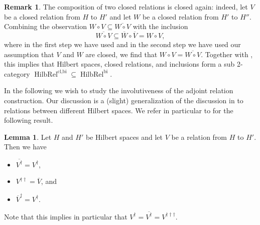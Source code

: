 \documentclass{article}
\newcommand{\HilbRel}{\operatorname{HilbRel}}%
\numberwithin{equation}{section}
\theoremstyle{definition}
\newtheorem{lemma}[definition]{Lemma}
\newtheorem{remark}[definition]{Remark}
\theoremstyle{theorem}
\begin{document}
\begin{remark}
    The composition of two closed relations is closed again: indeed, let $V$ be a closed relation from $H$ to $H'$ and let $W$ be a closed relation from 
    $H'$ to $H''$. Combining the observation $W \circ V \subseteq \overline{W \circ V}$ with the inclusion 
    \begin{equation}
        \overline{W \circ V} \subseteq \overline{W} \circ \overline{V} = W \circ V,
    \end{equation}
    where in the first step we have used  and in the second step we have used our assumption 
    that $V$ and $W$ are closed, we find that $W \circ V = \overline{W \circ V}$. Together with , 
    this implies that Hilbert spaces, closed relations, and inclusions form a sub 2-category $\HilbRel^{\text{cl,bi}} \subseteq \HilbRel^{\text{bi}}$. 
\end{remark}
In the following we wish to study the involutiveness of the adjoint relation construction. Our discussion is a (slight) generalization of the discussion in 
\cite{Remline2021unbounded} to relations between different Hilbert spaces. We refer in particular to \cite[Theorem 11.7]{Remline2021unbounded} for the following result.
\begin{lemma}\label{Lemma: relations adjoints and closedness}
    Let $H$ and $H'$ be Hilbert spaces and let $V$ be a relation from $H$ to $H'$. Then we have
    \begin{itemize}
        \item[(i)] $\overline{V^\dagger} = V^\dagger$,
        \item[(ii)] $V^{\dagger \dagger} = \overline{V}$, and
        \item[(iii)] $\overline{V}^{\dagger} = V^\dagger$. 
    \end{itemize}
    Note that this implies in particular that $V^\dagger = \overline{V^{\dagger}} = V^{\dagger \dagger \dagger}$.
\end{lemma}
\end{document}
